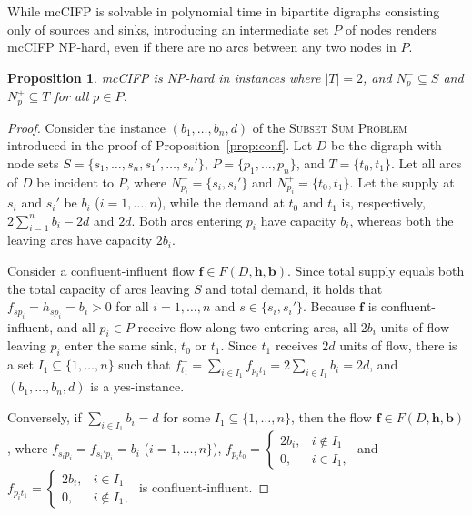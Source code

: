 \documentclass[pdflatex,sn-mathphys-num]{sn-jnl}%
\theoremstyle{thmstyleone}%
\newtheorem{proposition}[theorem]{Proposition}%
\newcommand{\len}[1]{\text{len}{(#1)}}
\begin{document}
While mcCIFP is solvable in polynomial time in bipartite digraphs consisting only of sources and sinks,
introducing an intermediate set $P$ of nodes renders mcCIFP NP-hard, even if there are no arcs between any two nodes in $P$.
\begin{proposition} \label{prop:confinf}
mcCIFP is NP-hard in instances where $|T|=2$, and $N_p^-\subseteq S$ and $N_p^+\subseteq T$ for all $p\in P$.
\end{proposition}
\begin{proof}
Consider the instance $(b_1,\ldots,b_n,d)$ of the \textsc{Subset Sum Problem} introduced in the proof of Proposition~\ref{prop:conf}.
Let $D$ be the digraph with node sets $S=\{s_1,\ldots,s_n,s_1',\ldots,s_n'\}$, $P=\{p_1,\ldots,p_n\}$, and $T=\{t_0,t_1\}$.
Let all arcs of $D$ be incident to $P$, where $N_{p_i}^-=\{s_i,s_i'\}$ and  $N_{p_i}^+=\{t_0,t_1\}$.
Let the supply at $s_i$ and $s_i'$ be $b_i$ ($i=1,\ldots,n$), while the demand at $t_0$ and $t_1$ is, respectively, $2\sum_{i=1}^nb_i-2d$ and $2d$.
Both arcs entering $p_i$ have capacity $b_i$, whereas both the leaving arcs have capacity $2b_i$.

Consider a confluent-influent flow $\boldsymbol{f}\in F(D,\boldsymbol{h},\boldsymbol{b})$.
Since total supply equals both the total capacity of arcs leaving $S$ and total demand, it holds that $f_{sp_i}=h_{sp_i}=b_i>0$ for all $i=1,\ldots,n$ and $s\in\{s_i,s_i'\}$.
Because $\boldsymbol{f}$ is confluent-influent, and all $p_i\in P$ receive flow along two entering arcs,
all $2b_i$ units of flow leaving $p_i$ enter the same sink, $t_0$ or $t_1$.
Since $t_1$ receives $2d$ units of flow, there is a set $I_1\subseteq \{1,\ldots,n\}$ such that $f_{t_1}^-=\sum_{i\in I_1}f_{p_it_1}=2\sum_{i\in I_1}{b_i}=2d$,
and $(b_1,\ldots,b_n,d)$ is a yes-instance.

Conversely, if $\sum_{i\in I_1}b_i=d$ for some $I_1\subseteq\{1,\ldots,n\}$, then the flow $\boldsymbol{f}\in F(D,\boldsymbol{h},\boldsymbol{b})$, where $f_{s_ip_i}=f_{s_i'p_i}=b_i$ ($i=1,\ldots,n\}$),
$f_{p_it_0}=\left\{\begin{array}{lr}2b_i, & i\notin I_1 \\ 0, & i\in I_1,\end{array}\right.$ and
$f_{p_it_1}=\left\{\begin{array}{lr}2b_i, & i\in I_1 \\ 0, & i\notin I_1,\end{array}\right.$ is confluent-influent.
\end{proof}
\end{document}
